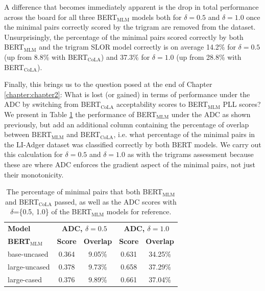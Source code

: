 A difference that becomes immediately apparent is the drop in total performance across the board for all three BERT$_{\mathrm{MLM}}$ models both for $\delta=0.5$ and $\delta=1.0$ once the minimal pairs correctly scored by the trigram are removed from the dataset.  Unsurprisingly, the percentage of the minimal pairs scored correctly by both BERT$_{\mathrm{MLM}}$ and the trigram SLOR model correctly is on average 14.2\% for $\delta=0.5$ (up from 8.8\% with BERT$_{\mathrm{CoLA}}$) and 37.3\% for $\delta=1.0$ (up from 28.8\% with BERT$_{\mathrm{CoLA}}$).

Finally, this brings us to the question posed at the end of Chapter \ref{chapter:chapter2}: What is lost (or gained) in terms of performance under the ADC by switching from  BERT$_{\mathrm{CoLA}}$ acceptability scores to BERT$_{\mathrm{MLM}}$ PLL scores?  We present in Table \ref{tab:table_22} the performance of BERT$_{\mathrm{MLM}}$ under the ADC as shown previously, but add an additional column containing the percentage of overlap between BERT$_{\mathrm{MLM}}$ and BERT$_{\mathrm{CoLA}}$, i.e. what percentage of the minimal pairs in the LI-Adger dataset was classified correctly by both BERT models.  We carry out this calculation for $\delta=0.5$ and $\delta=1.0$ as with the trigrams assessment because these are where ADC enforces the gradient aspect of the minimal pairs, not just their monotonicity.

\begin{table}[h!]
    \centering
    \begin{tabular}{@{}lcccc@{}}
    \toprule
    \textbf{Model} & \multicolumn{2}{c}{\textbf{ADC, $\delta=0.5$}} &  \multicolumn{2}{c}{\textbf{ADC, $\delta=1.0$}} \\
    \cmidrule{2-3} \cmidrule{4-5}
    \textbf{BERT}$_{\mathrm{MLM}}$ & \textbf{Score} & \textbf{Overlap} & \textbf{Score} & \textbf{Overlap}  \\
    \midrule
    base-uncased & 0.364 & 9.05\% & 0.631 & 34.25\% \\
    large-uncased & 0.378 & 9.73\% & 0.658 & 37.29\% \\
    large-cased & 0.376 & 9.89\% & 0.661 & 37.04\% \\
    \bottomrule
    \end{tabular}
    \caption[Overlap between BERT$_{\mathrm{MLM}}$ and BERT$_{\mathrm{CoLA}}$ under the ADC]{The percentage of minimal pairs that both BERT$_{\mathrm{MLM}}$ and BERT$_{\mathrm{CoLA}}$ passed, as well as the ADC scores with $\delta$=\{0.5, 1.0\} of the BERT$_{\mathrm{MLM}}$ models for reference.}
    \label{tab:table_22}
\end{table}

